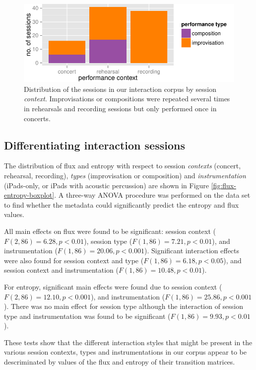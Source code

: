 \documentclass{sigchi}
\begin{document}
\begin{figure}
  \centering
  \includegraphics[width=\linewidth]{figures/sessions-count}
  \caption{Distribution of the sessions in our interaction corpus by
    session {\em context}. Improvisations or compositions were repeated
    several times in rehearsals and recording sessions but only performed
    once in concerts.
    \label{fig:count-data}}
\end{figure}

\subsection{Differentiating interaction sessions}
\label{differentiating-interaction-sessions}

The distribution of flux and entropy with respect to session {\em contexts} (concert,
rehearsal, recording),
{\em types} (improvisation or composition) and {\em instrumentation} (iPads-only, or iPads with acoustic
percussion) are shown in Figure
\ref{fig:flux-entropy-boxplot}. A three-way ANOVA procedure was
performed on the data set to find whether the metadata could
significantly predict the entropy and flux values.

All main effects on flux were found to be significant: session
context ($F(2,86) = 6.28, p < 0.01$), session type
($F(1,86) = 7.21, p < 0.01$), and instrumentation
($F(1,86) = 20.06, p < 0.001$). Significant interaction effects were
also found for session context and type
($F(1,86) = 6.18, p < 0.05$), and session context and
instrumentation ($F(1,86) = 10.48, p < 0.01$).

For entropy, significant main effects were found due to session
context ($F(2,86) = 12.10, p < 0.001$), and instrumentation
($F(1,86) = 25.86, p < 0.001$).
There was no main effect for session type although
 the interaction of session type and
instrumentation was found to be significant
($F(1,86) = 9.93, p<0.01$).

These tests show that the different interaction styles that might be
present in the various session contexts, types and instrumentations in our corpus
appear to be descriminated  by values of the flux and entropy of their transition
matrices.
\end{document}
